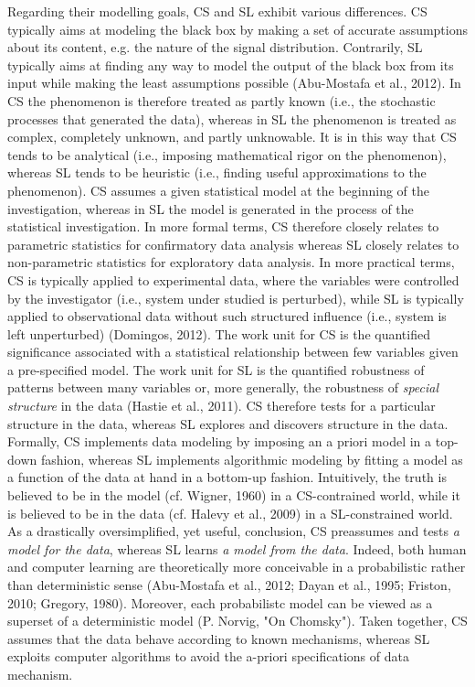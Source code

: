\documentclass[authoryear,review,3p]{elsarticle}
\begin{document}
Regarding their modelling goals, CS and SL exhibit various differences.
CS typically aims at modeling the black box by making a set of
accurate assumptions about its content,
e.g. the nature of the signal distribution.
Contrarily, SL typically aims at finding any way to model
the output of the black box from its input
while making the least assumptions possible (Abu-Mostafa et al., 2012).
In CS the phenomenon is therefore treated as partly known
(i.e., the stochastic processes that generated the data),
whereas in SL the phenomenon is treated as complex,
completely unknown, and partly unknowable.
It is in this way that CS tends to be
analytical
(i.e., imposing mathematical rigor on the phenomenon),
whereas SL tends to be
heuristic
(i.e., finding useful approximations to the phenomenon).
CS assumes a given statistical model at the beginning of the investigation,
whereas in SL the model is
generated in the process of the statistical investigation.
In more formal terms,
CS therefore closely relates to parametric statistics
for confirmatory data analysis
whereas SL closely relates to non-parametric statistics
for exploratory data analysis.
In more practical terms, CS is typically applied to experimental data,
where the variables were controlled by the investigator
(i.e., system under studied is perturbed),
while SL is typically applied to observational
data without such structured influence
(i.e., system is left unperturbed) (Domingos, 2012).
The work unit for CS is the quantified
significance associated with a statistical
relationship between few variables given a pre-specified model.
The work unit for SL is the quantified robustness of patterns
between many variables or, more generally,
the robustness of \textit{special structure} in the data (Hastie et al., 2011).
CS therefore tests for a particular structure in the data,
whereas SL explores and discovers structure in the data.
Formally, CS implements data modeling by
imposing an a priori model in a top-down fashion,
whereas SL implements algorithmic modeling by fitting
a model as a function of the data at hand in a bottom-up fashion.
%
Intuitively, the truth is believed
to be in the model (cf. Wigner, 1960) in a CS-contrained world,
while it is believed to be in the data
(cf. Halevy et al., 2009) in a SL-constrained world.
As a drastically oversimplified, yet useful, conclusion,
CS preassumes and tests \textit{a model for the data},
whereas SL learns \textit{a model from the data}.
%
Indeed,
both human and computer learning are theoretically
more conceivable in a probabilistic rather than
deterministic sense
(Abu-Mostafa et al., 2012; Dayan et al., 1995; Friston, 2010; Gregory, 1980).
Moreover, each probabilistc model can be viewed as a superset
of a deterministic model (P. Norvig, "On Chomsky").
%
Taken together,
CS assumes that the data behave according to known mechanisms,
whereas SL exploits
computer algorithms to avoid the a-priori
specifications of data mechanism.
\end{document}

